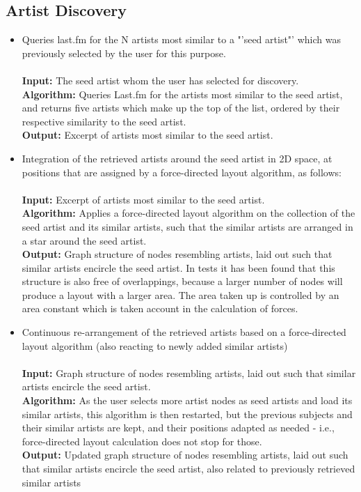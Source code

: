 \subsection{Artist Discovery}

\begin{itemize}
	\item Queries last.fm for the N artists most similar to a "'seed artist"' which was previously selected by the user for this purpose.\\\\
				\textbf{Input:} The seed artist whom the user has selected for discovery. \\
				\textbf{Algorithm:} Queries Last.fm for the artists most similar to the seed artist, and returns five artists which make up the top of the list, ordered by their respective similarity to the seed artist. \\
				\textbf{Output:} Excerpt of artists most similar to the seed artist. \\
	\item Integration of the retrieved artists around the seed artist in 2D space, at positions that are assigned by a force-directed layout algorithm, as follows: \\\\
				\textbf{Input:} Excerpt of artists most similar to the seed artist. \\
				\textbf{Algorithm:} Applies a force-directed layout algorithm on the collection of the seed artist and	its similar artists, such that the similar artists are arranged in a star around the seed artist. \\
				\textbf{Output:} Graph structure of nodes resembling artists, laid out such that similar artists encircle the seed artist. In tests it has been found that this structure is also free of overlappings, because a larger number of nodes will produce a layout with a larger area. The area taken up is controlled by an area constant which is taken account in the calculation of forces. \\
	\item Continuous re-arrangement of the retrieved artists based on a force-directed layout algorithm (also reacting to newly added similar artists) \\\\
				\textbf{Input:} Graph structure of nodes resembling artists, laid out such that similar	artists encircle the seed artist. \\
				\textbf{Algorithm:} As the user selects more artist nodes as seed artists and load its similar artists, this algorithm is then restarted, but the previous subjects and their	similar artists are kept, and their positions adapted as needed - i.e., force-directed layout calculation does not stop for those. \\
				\textbf{Output:} Updated graph structure of nodes resembling artists, laid out such that similar artists encircle the seed artist, also related to previously retrieved similar artists \\
\end{itemize}

